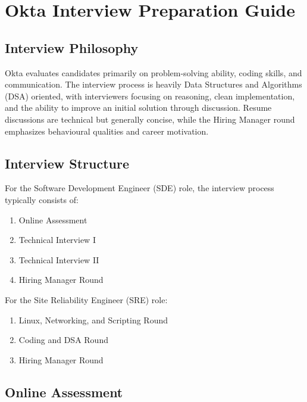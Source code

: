 \documentclass[11pt,a4paper]{article}
\begin{document}
\section{Okta Interview Preparation Guide}

\subsection{Interview Philosophy}

Okta evaluates candidates primarily on problem-solving ability, coding skills, and communication. The interview process is heavily Data Structures and Algorithms (DSA) oriented, with interviewers focusing on reasoning, clean implementation, and the ability to improve an initial solution through discussion. Resume discussions are technical but generally concise, while the Hiring Manager round emphasizes behavioural qualities and career motivation.


\subsection{Interview Structure}

For the Software Development Engineer (SDE) role, the interview process typically consists of:

\begin{enumerate}
	\item Online Assessment
	\item Technical Interview I
	\item Technical Interview II
	\item Hiring Manager Round
\end{enumerate}

For the Site Reliability Engineer (SRE) role:

\begin{enumerate}
	\item Linux, Networking, and Scripting Round
	\item Coding and DSA Round
	\item Hiring Manager Round
\end{enumerate}


\subsection{Online Assessment}
\end{document}
